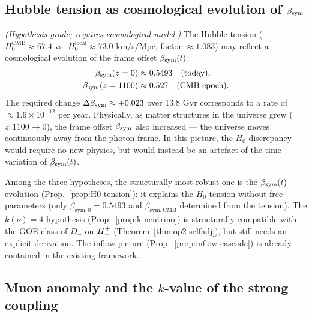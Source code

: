 \subsection{Hubble tension as cosmological evolution of $\beta_{\mathrm{sym}}$}

\begin{proposition}
\label{prop:H0-tension}
\emph{(Hypothesis-grade; requires cosmological model.)}
The Hubble tension ($H_0^{\mathrm{CMB}} \approx 67.4$ vs.
$H_0^{\mathrm{local}} \approx 73.0$ km/s/Mpc, factor $\approx 1.083$)
may reflect a cosmological evolution of the frame offset $\beta_{\mathrm{sym}}(t)$:
\begin{align*}
  \beta_{\mathrm{sym}}(z=0) &\approx 0.5493 \quad \text{(today)}, \\
  \beta_{\mathrm{sym}}(z=1100) &\approx 0.527 \quad \text{(CMB epoch)}.
\end{align*}
The required change $\Delta\beta_{\mathrm{sym}} \approx +0.023$ over 13.8 Gyr
corresponds to a rate of $\approx 1.6\times 10^{-12}$ per year.
Physically, as matter structures in the universe grew ($z: 1100\to 0$),
the frame offset $\beta_{\mathrm{sym}}$ also increased --- the universe moves
continuously away from the photon frame.
In this picture, the $H_0$ discrepancy would require no new physics,
but would instead be an artefact of the time variation of $\beta_{\mathrm{sym}}(t)$.
\end{proposition}

\begin{remark}
\label{rem:inflow-evaluation}
Among the three hypotheses, the structurally most robust one is the
$\beta_{\mathrm{sym}}(t)$ evolution (Prop.~\ref{prop:H0-tension}): it explains the
$H_0$ tension without free parameters (only
$\beta_{\mathrm{sym},0} = 0.5493$ and
$\beta_{\mathrm{sym},\mathrm{CMB}}$ determined from the tension).
The $k(\nu) = 4$ hypothesis (Prop.~\ref{prop:k-neutrino}) is
structurally compatible with the GOE class of $D_-$ on $H^+_-$
(Theorem~\ref{thm:op2-selfadj}), but still needs an explicit derivation.
The inflow picture (Prop.~\ref{prop:inflow-cascade}) is already contained
in the existing framework.
\end{remark}

\subsection{Muon anomaly and the $k$-value of the strong coupling}
\label{sec:muon-anomaly}

